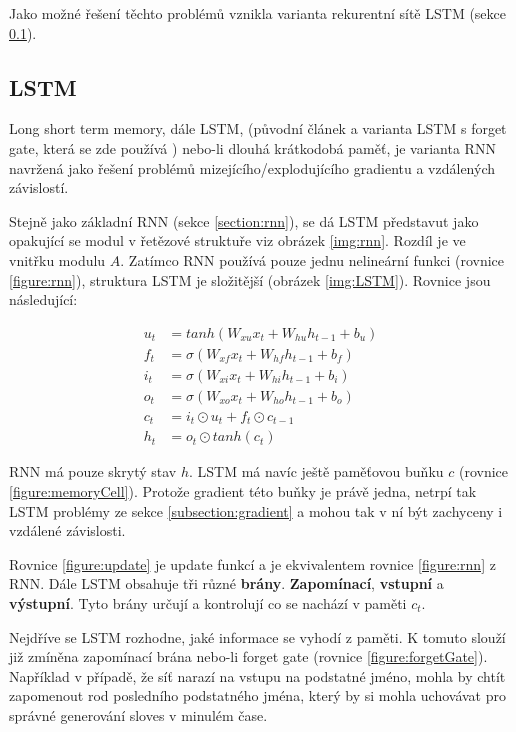 Jako možné řešení těchto problémů vznikla varianta rekurentní sítě LSTM (sekce \ref{section:LSTM}).




\subsection{LSTM}\label{section:LSTM}
Long short term memory, dále LSTM, (původní článek \cite{LSTM} a varianta LSTM s forget gate, která se zde používá \cite{forgetLSTM}) nebo-li dlouhá krátkodobá paměť, je varianta RNN navržená jako řešení problémů mizejícího/explodujícího gradientu a vzdálených závislostí.

Stejně jako základní RNN (sekce \ref{section:rnn}), se dá LSTM představut jako opakující se modul v řetězové struktuře viz obrázek \ref{img:rnn}. Rozdíl je ve vnitřku modulu $A$. Zatímco RNN používá pouze jednu nelineární funkci (rovnice \ref{figure:rnn}), struktura LSTM je složitější (obrázek \ref{img:LSTM}). Rovnice jsou následující:

\begin{align}
    u_{t}&=tanh(W_{xu}x_t + W_{hu}h_{t-1} + b_u) \label{figure:update} \\
    f_{t}&=\sigma(W_{xf}x_{t}+W_{hf}h_{t-1}+b_{f}) \label{figure:forgetGate} \\
    i_{t}&=\sigma(W_{xi}x_{t}+W_{hi}h_{t-1}+b_{i}) \label{figure:inputGate} \\
    o_{t}&=\sigma(W_{xo}x_{t}+W_{ho}h_{t-1}+b_{o}) \label{figure:outputGate} \\
    c_{t}&=i_{t}\odot u_{t}+f_{t}\odot c_{t-1}\label{figure:memoryCell} \\
    h_{t}&=o_{t}\odot tanh(c_{t}) \label{figure:hiddenState}
\end{align}

RNN má pouze skrytý stav $h$. LSTM má navíc ještě paměťovou buňku $c$ (rovnice \ref{figure:memoryCell}). Protože gradient této buňky je právě jedna, netrpí tak LSTM problémy ze sekce \ref{subsection:gradient} a mohou tak v ní být zachyceny i vzdálené závislosti.

Rovnice \ref{figure:update} je update funkcí a je ekvivalentem rovnice \ref{figure:rnn} z RNN.
Dále LSTM obsahuje tři různé \textbf{brány}. \textbf{Zapomínací}, \textbf{vstupní} a \textbf{výstupní}. Tyto brány určují a kontrolují co se nachází v paměti $c_t$.

Nejdříve se LSTM rozhodne, jaké informace se vyhodí z paměti. K tomuto slouží již zmíněna zapomínací brána nebo-li forget gate (rovnice \ref{figure:forgetGate}). Například v případě, že síť narazí na vstupu na podstatné jméno, mohla by chtít zapomenout rod posledního podstatného jména, který by si mohla uchovávat pro správné generování sloves v minulém čase.

